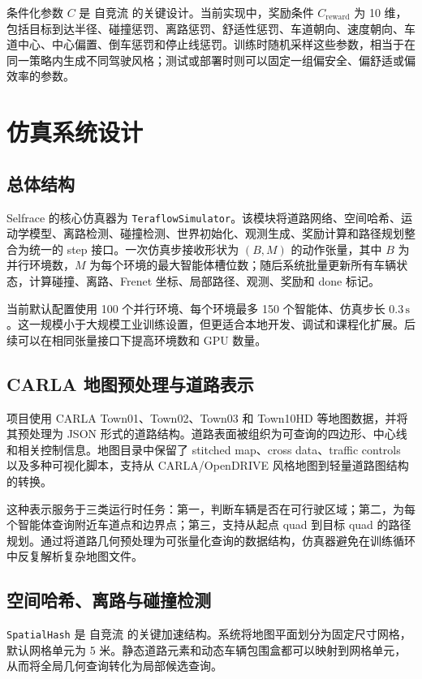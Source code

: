 \documentclass[preprint,12pt]{elsarticle}
\newcommand{\Selfrace}{Selfrace}
\newcommand{\Zijingliu}{自竞流}
\begin{document}
条件化参数 $C$ 是 \Zijingliu{} 的关键设计。当前实现中，奖励条件 $C_{\text{reward}}$ 为 10 维，包括目标到达半径、碰撞惩罚、离路惩罚、舒适性惩罚、车道朝向、速度朝向、车道中心、中心偏置、倒车惩罚和停止线惩罚。训练时随机采样这些参数，相当于在同一策略内生成不同驾驶风格；测试或部署时则可以固定一组偏安全、偏舒适或偏效率的参数。

\section{仿真系统设计}

\subsection{总体结构}

\Selfrace{} 的核心仿真器为 \texttt{TeraflowSimulator}。该模块将道路网络、空间哈希、运动学模型、离路检测、碰撞检测、世界初始化、观测生成、奖励计算和路径规划整合为统一的 step 接口。一次仿真步接收形状为 $(B,M)$ 的动作张量，其中 $B$ 为并行环境数，$M$ 为每个环境的最大智能体槽位数；随后系统批量更新所有车辆状态，计算碰撞、离路、Frenet 坐标、局部路径、观测、奖励和 done 标记。

当前默认配置使用 100 个并行环境、每个环境最多 150 个智能体、仿真步长 $0.3\,\mathrm{s}$。这一规模小于大规模工业训练设置，但更适合本地开发、调试和课程化扩展。后续可以在相同张量接口下提高环境数和 GPU 数量。

\subsection{CARLA 地图预处理与道路表示}

项目使用 CARLA Town01、Town02、Town03 和 Town10HD 等地图数据，并将其预处理为 JSON 形式的道路结构。道路表面被组织为可查询的四边形、中心线和相关控制信息。地图目录中保留了 stitched map、cross data、traffic controls 以及多种可视化脚本，支持从 CARLA/OpenDRIVE 风格地图到轻量道路图结构的转换。

这种表示服务于三类运行时任务：第一，判断车辆是否在可行驶区域；第二，为每个智能体查询附近车道点和边界点；第三，支持从起点 quad 到目标 quad 的路径规划。通过将道路几何预处理为可张量化查询的数据结构，仿真器避免在训练循环中反复解析复杂地图文件。

\subsection{空间哈希、离路与碰撞检测}

\texttt{SpatialHash} 是 \Zijingliu{} 的关键加速结构。系统将地图平面划分为固定尺寸网格，默认网格单元为 5 米。静态道路元素和动态车辆包围盒都可以映射到网格单元，从而将全局几何查询转化为局部候选查询。
\end{document}
